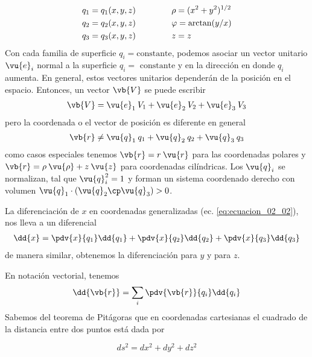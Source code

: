 \begin{align}
\begin{aligned}
q_{1} = q_{1}(x,y,z) & \hspace{1.5cm} \rho = (x^{2} + y^{2})^{1/2} \\
q_{2} = q_{2}(x,y,z) & \hspace{1.5cm} \varphi = \arctan(y/x) \\
q_{3} = q_{3}(x,y,z) & \hspace{1.5cm} z = z
\end{aligned}
\label{eq:ecuacion_02_02}
\end{align}
Con cada familia de superficie $q_{i} = \mbox {constante}$, podemos asociar un vector unitario $\vu{e}_{i}$ normal a la superficie $q_{i} = \mbox{ constante}$ y en la dirección en donde $q_{i}$ aumenta. En general, estos vectores unitarios dependerán de la posición en el espacio. Entonces,  un vector $\vb{V}$ se puede escribir
\begin{align}
\vb{V} = \vu{e}_{1} \: V_{1} +\vu{e}_{2} \: V_{2} + \vu{e}_{3} \: V_{3}
\end{align}
pero la coordenada o el vector de posición es diferente en general
\begin{align*}
\vb{r} \neq \vu{q}_{1} \: q_{1} + \vu{q}_{2} \: q_{2} + \vu{q}_{3} \: q_{3}
\end{align*}
como casos especiales tenemos $\vb{r} = r \: \vu{r}$ para las coordenadas polares y $\vb{r} = \rho \: \vu{\rho} + z \: \vu{z}$ para coordenadas cilíndricas. Los $\vu{q}_{i}$ se normalizan, tal que $\vu{q}_{i}^{2} = 1$ y forman un sistema coordenado derecho con volumen $\vu{q}_{1} \cdot (\vu{q}_{2} \cp \vu{q}_{3} ) > 0$.
\par
La diferenciación de $x$ en coordenadas generalizadas (ec. \ref{eq:ecuacion_02_02}), nos lleva a un diferencial
\begin{align}
\dd{x} = \pdv{x}{q_{1}} \dd{q_{1}} + \pdv{x}{q_{2}} \dd{q_{2}} + \pdv{x}{q_{3}} \dd{q_{3}}
\label{eq:ecuacion_02_04}
\end{align}
de manera similar, obtenemos la diferenciación para $y$ y para $z$.
\par
En notación vectorial, tenemos
\begin{align*}
\dd{\vb{r}} = \sum_{i} \pdv{\vb{r}}{q_{i}} \dd{q_{i}}
\end{align*}
Sabemos del teorema de Pitágoras que en coordenadas cartesianas el cuadrado de la distancia entre dos puntos está dada por

\[ ds^{2} = dx^{2} + dy^{2} + dz^{2} \]

